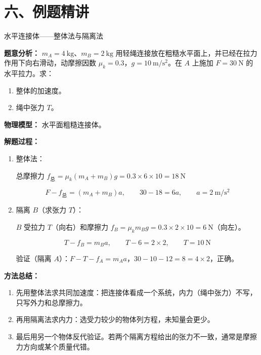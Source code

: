 \section*{六、例题精讲}

\begin{examplebox}{水平连接体——整体法与隔离法}

\textbf{题意分析：} $m_A = 4\ \mathrm{kg}$、$m_B = 2\ \mathrm{kg}$ 用轻绳连接放在粗糙水平面上，并已经在拉力作用下向右滑动，动摩擦因数 $\mu_k = 0.3$，$g = 10\ \mathrm{m/s^2}$。在 $A$ 上施加 $F = 30\ \mathrm{N}$ 的水平拉力。求：
\begin{enumerate}
  \item 整体的加速度。
  \item 绳中张力 $T$。
\end{enumerate}

\textbf{物理模型：} 水平面粗糙连接体。

\textbf{解题过程：}

\begin{enumerate}
  \item 整体法：

  总摩擦力 $f_{\text{总}} = \mu_k (m_A + m_B) g = 0.3 \times 6 \times 10 = 18\ \mathrm{N}$

  \[
  F - f_{\text{总}} = (m_A + m_B) a,\qquad 30 - 18 = 6a,\qquad a = 2\ \mathrm{m/s^2}
  \]

  \item 隔离 $B$（求张力 $T$）：

  $B$ 受拉力 $T$（向右）和摩擦力 $f_B = \mu_k m_B g = 0.3 \times 2 \times 10 = 6\ \mathrm{N}$（向左）。

  \[
  T - f_B = m_B a,\qquad T - 6 = 2 \times 2,\qquad T = 10\ \mathrm{N}
  \]

  验证（隔离 $A$）：$F - T - f_A = m_A a$，$30 - 10 - 12 = 8 = 4 \times 2$，正确。
\end{enumerate}

\textbf{方法总结：}
\begin{enumerate}
  \item 先用整体法求共同加速度：把连接体看成一个系统，内力（绳中张力）不写，只写外力和总摩擦力。
  \item 再用隔离法求内力：选受力较少的物体列方程，未知量会更少。
  \item 最后用另一个物体反代验证。若两个隔离方程给出的张力不一致，通常是摩擦力方向或某个质量代错。
\end{enumerate}

\end{examplebox}

